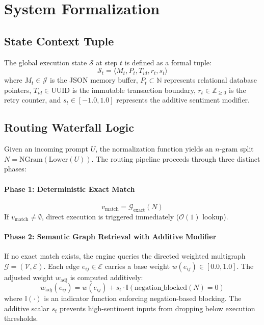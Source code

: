 \documentclass[10pt,twocolumn]{article}
\begin{document}
\section{System Formalization}

\subsection{State Context Tuple}
The global execution state $\mathcal{S}$ at step $t$ is defined as a formal tuple:
\begin{equation}
\mathcal{S}_t = \langle M_t, P_t, T_{id}, r_t, s_t \rangle
\end{equation}
where $M_t \in \mathcal{J}$ is the JSON memory buffer, $P_t \subset \mathbb{N}$ represents relational database pointers, $T_{id} \in \text{UUID}$ is the immutable transaction boundary, $r_t \in \mathbb{Z}_{\ge 0}$ is the retry counter, and $s_t \in [-1.0, 1.0]$ represents the additive sentiment modifier.

\subsection{Routing Waterfall Logic}
Given an incoming prompt $U$, the normalization function yields an $n$-gram split $N = \text{NGram}(\text{Lower}(U))$. The routing pipeline proceeds through three distinct phases:

\paragraph{Phase 1: Deterministic Exact Match}
\begin{equation}
v_{\text{match}} = \mathcal{G}_{\text{exact}}(N)
\end{equation}
If $v_{\text{match}} \neq \emptyset$, direct execution is triggered immediately ($\mathcal{O}(1)$ lookup).

\paragraph{Phase 2: Semantic Graph Retrieval with Additive Modifier}
If no exact match exists, the engine queries the directed weighted multigraph $\mathcal{G} = (\mathcal{V}, \mathcal{E})$. Each edge $e_{ij} \in \mathcal{E}$ carries a base weight $w(e_{ij}) \in [0.0, 1.0]$. The adjusted weight $w_{\text{adj}}$ is computed additively:
\begin{equation}
w_{\text{adj}}(e_{ij}) = w(e_{ij}) + s_t \cdot \mathbb{I}(\text{negation\_blocked}(N) = 0)
\end{equation}
where $\mathbb{I}(\cdot)$ is an indicator function enforcing negation-based blocking. The additive scalar $s_t$ prevents high-sentiment inputs from dropping below execution thresholds.
\end{document}

